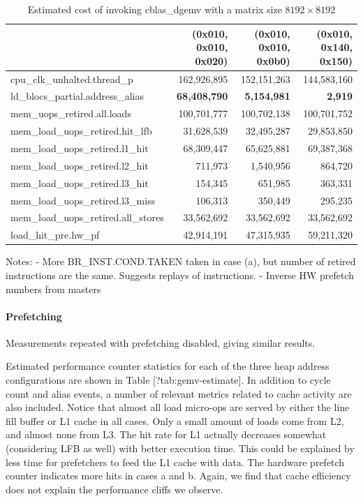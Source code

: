 \documentclass[a4paper,10pt,twocolumn,twoside]{article}
\newcommand{\perfctr}[1] {
  {\lowercase{#1}}
}
\begin{document}
\begin{table}[t]
  \caption{Estimated cost of invoking cblas\_dgemv with a matrix size $8192 \times 8192$}
  \label{tab:atlas8k}
  \small
  \centering
  \begin{tabular}{l r r r}
    \toprule
      & (0x010, 0x010, 0x020) & (0x010, 0x010, 0x0b0) & (0x010, 0x140, 0x150) \\
    \midrule
    \perfctr{cpu_clk_unhalted.thread_p} & 162,926,895 & 152,151,263 & 144,583,160 \\
    \perfctr{ld_blocs_partial.address_alias} & \textbf{68,408,790} & \textbf{5,154,981} & \textbf{2,919} \\

    \perfctr{mem_uops_retired.all.loads} & 100,701,777 & 100,702,138 & 100,701,752 \\
    \perfctr{mem_load_uops_retired.hit_lfb} & 31,628,539 & 32,495,287 & 29,853,850 \\
    \perfctr{mem_load_uops_retired.l1_hit} & 68,309,447 & 65,625,881 & 69,387,368 \\
    \perfctr{mem_load_uops_retired.l2_hit} & 711,973 & 1,540,956 & 864,720 \\
    \perfctr{mem_load_uops_retired.l3_hit} & 154,345 & 651,985 & 363,331 \\
    \perfctr{mem_load_uops_retired.l3_miss} & 106,313 & 350,449 & 295,235 \\
    \perfctr{mem_load_uops_retired.all_stores} & 33,562,692 & 33,562,692 & 33,562,692 \\

    \perfctr{load_hit_pre.hw_pf} & 42,914,191 & 47,315,935 & 59,211,320 \\
    \bottomrule
  \end{tabular}
\end{table}

Notes: 
 - More BR\_INST.COND.TAKEN taken in case (a), but number of retired instructions are the same. Suggests replays of instructions.
 - Inverse HW prefetch numbers from masters

\paragraph{Prefetching}
Measurements repeated with prefetching disabled, giving similar results. 

Estimated performance counter statistics for each of the three heap address configurations are shown in Table [?tab:gemv-estimate].
In addition to cycle count and alias events, a number of relevant metrics related to cache activity are also included.
Notice that almost all load micro-ops are served by either the line fill buffer or L1 cache in all cases.
Only a small amount of loads come from L2, and almost none from L3.
The hit rate for L1 actually decreases somewhat (considering LFB as well) with better execution time.
This could be explained by less time for prefetchers to feed the L1 cache with data.
The hardware prefetch counter indicates more hits in cases a and b.
Again, we find that cache efficiency does not explain the performance cliffs we observe. 
\end{document}

